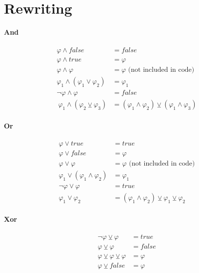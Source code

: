 
\section{Rewriting}
\label{sec:rewriting}
    
\paragraph{And}
    
\begin{align}
	\varphi \land false &= false\\
	\varphi \land true &= \varphi\\
	\varphi \land \varphi &= \varphi \text{~(not included in code)}\\
	\varphi_1 \land (\varphi_1 \lor \varphi_2) &= \varphi_1     \\ 
	\neg \varphi \land \varphi &= false\\\
	\varphi_1 \land (\varphi_2 \veebar \varphi_3) &= (\varphi_1 \land \varphi_2) \veebar (\varphi_1 \land \varphi_3)
\end{align} 

\paragraph{Or}

\begin{align}
	\varphi \lor true &= true\\
	\varphi \lor false &= \varphi\\
	\varphi \lor \varphi &= \varphi \text{~(not included in code)}\\
	\varphi_1 \lor (\varphi_1 \land \varphi_2) &= \varphi_1 \\
	\neg \varphi \lor \varphi &= true\\
	\varphi_1 \lor \varphi_2 &= (\varphi_1 \land \varphi_2) \veebar \varphi_1 \veebar \varphi_2
\end{align} 

\paragraph{Xor}
\begin{align}
	\neg \varphi \veebar \varphi &= true\\
	\varphi \veebar \varphi &= false\\
	\varphi \veebar \varphi \veebar \varphi &= \varphi\\
	\varphi \veebar false &= \varphi          
\end{align} 


